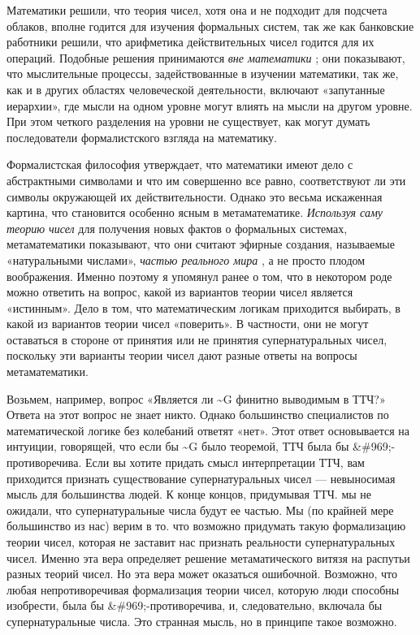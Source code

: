 \documentclass[../main.tex]{subfiles}
\begin{document}
Математики решили, что теория чисел, хотя она и не подходит для подсчета облаков, вполне годится для изучения формальных систем, так же как банковские работники решили, что арифметика действительных чисел годится для их операций. Подобные решения принимаются \emph{вне математики} ; они показывают, что мыслительные процессы, задействованные в изучении математики, так же, как и в других областях человеческой деятельности, включают «запутанные иерархии», где мысли на одном уровне могут влиять на мысли на другом уровне. При этом четкого разделения на уровни не существует, как могут думать последователи формалистского взгляда на математику.

Формалистская философия утверждает, что математики имеют дело с абстрактными символами и что им совершенно все равно, соответствуют ли эти символы окружающей их действительности. Однако это весьма искаженная картина, что становится особенно ясным в метаматематике. \emph{Используя саму теорию чисел} для получения новых фактов о формальных системах, метаматематики показывают, что они считают эфирные создания, называемые «натуральными числами», \emph{частью реального мира} , а не просто плодом воображения. Именно поэтому я упомянул ранее о том, что в некотором роде можно ответить на вопрос, какой из вариантов теории чисел является «истинным». Дело в том, что математическим логикам приходится выбирать, в какой из вариантов теории чисел «поверить». В частности, они не могут оставаться в стороне от принятия или не принятия супернатуральных чисел, поскольку эти варианты теории чисел дают разные ответы на вопросы метаматематики.

Возьмем, например, вопрос «Является ли \textasciitilde G финитно выводимым в ТТЧ?» Ответа на этот вопрос не знает никто. Однако большинство специалистов по математической логике без колебаний ответят «нет». Этот ответ основывается на интуиции, говорящей, что если бы \textasciitilde G было теоремой, ТТЧ была бы \&\#969;-противоречива. Если вы хотите придать смысл интерпретации ТТЧ, вам приходится признать существование супернатуральных чисел --- невыносимая мысль для большинства людей. К конце концов, придумывая ТТЧ. мы не ожидали, что супернатуральные числа будут ее частью. Мы (по крайней мере большинство из нас) верим в то. что возможно придумать такую формализацию теории чисел, которая не заставит нас признать реальности супернатуральных чисел. Именно эта вера определяет решение метаматического витязя на распутьи разных теорий чисел. Но эта вера может оказаться ошибочной. Возможно, что любая непротиворечивая формализация теории чисел, которую люди способны изобрести, была бы \&\#969;-противоречива, и, следовательно, включала бы супернатуральные числа. Это странная мысль, но в принципе такое возможно.
\end{document}
